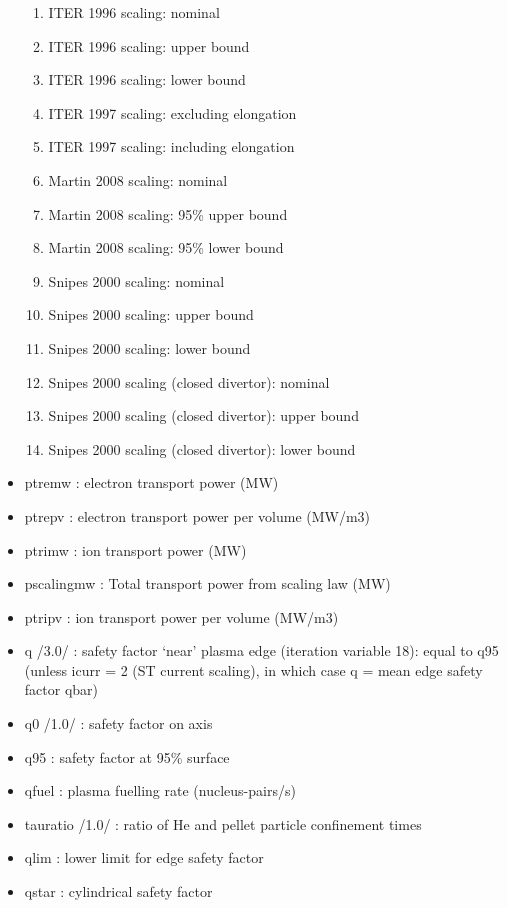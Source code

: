 \documentclass[]{article}
\providecommand{\tightlist}{%
  \setlength{\itemsep}{0pt}\setlength{\parskip}{0pt}}
\begin{document}
\begin{itemize}
  \begin{enumerate}
  \tightlist
  \item
    ITER 1996 scaling: nominal
  \item
    ITER 1996 scaling: upper bound
  \item
    ITER 1996 scaling: lower bound
  \item
    ITER 1997 scaling: excluding elongation
  \item
    ITER 1997 scaling: including elongation
  \item
    Martin 2008 scaling: nominal
  \item
    Martin 2008 scaling: 95\% upper bound
  \item
    Martin 2008 scaling: 95\% lower bound
  \item
    Snipes 2000 scaling: nominal
  \item
    Snipes 2000 scaling: upper bound
  \item
    Snipes 2000 scaling: lower bound
  \item
    Snipes 2000 scaling (closed divertor): nominal
  \item
    Snipes 2000 scaling (closed divertor): upper bound
  \item
    Snipes 2000 scaling (closed divertor): lower bound
  \end{enumerate}
\item
  ptremw : electron transport power (MW)
\item
  ptrepv : electron transport power per volume (MW/m3)
\item
  ptrimw : ion transport power (MW)
\item
  pscalingmw : Total transport power from scaling law (MW)
\item
  ptripv : ion transport power per volume (MW/m3)
\item
  q /3.0/ : safety factor `near' plasma edge (iteration variable 18):
  equal to q95 (unless icurr = 2 (ST current scaling), in which case q =
  mean edge safety factor qbar)
\item
  q0 /1.0/ : safety factor on axis
\item
  q95 : safety factor at 95\% surface
\item
  qfuel : plasma fuelling rate (nucleus-pairs/s)
\item
  tauratio /1.0/ : ratio of He and pellet particle confinement times
\item
  qlim : lower limit for edge safety factor
\item
  qstar : cylindrical safety factor

\end{itemize}
\end{document}
